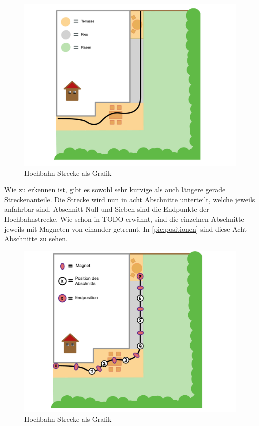 \begin{figure}[h]
	\begin{center}
		\includegraphics[width = \textwidth]{Streckengrafik.pdf}
		\caption{\label{pic:streckengrafik} Hochbahn-Strecke als Grafik}
	\end{center}
\end{figure}

Wie zu erkennen ist, gibt es sowohl sehr kurvige als auch längere gerade Streckenanteile. Die Strecke wird nun in acht Abschnitte unterteilt, welche jeweils anfahrbar sind. Abschnitt Null und Sieben sind die Endpunkte der Hochbahnstrecke. Wie schon in TODO erwähnt, sind die einzelnen Abschnitte jeweils mit Magneten von einander getrennt. In \autoref{pic:positionen} sind diese Acht Abschnitte zu sehen.
\newpage
\begin{figure}[h]
	\begin{center}
		\includegraphics[width = \textwidth]{Positionen.pdf}
		\caption{\label{pic:positionen} Hochbahn-Strecke als Grafik}
	\end{center}
\end{figure}

